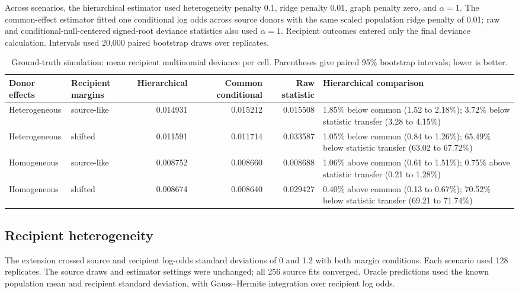 \documentclass[10pt,a4paper]{article}
\begin{document}
Across scenarios, the hierarchical estimator used heterogeneity penalty 0.1, ridge penalty 0.01, graph penalty zero, and $\alpha=1$. The common-effect estimator fitted one conditional log odds across source donors with the same scaled population ridge penalty of 0.01; raw and conditional-null-centered signed-root deviance statistics also used $\alpha=1$. Recipient outcomes entered only the final deviance calculation. Intervals used 20,000 paired bootstrap draws over replicates.

\begin{table}[ht]
\centering
\caption{Ground-truth simulation: mean recipient multinomial deviance per cell. Parentheses give paired 95\% bootstrap intervals; lower is better.}
\label{tab:s-ground-truth}
\small
\begin{tabularx}{\textwidth}{@{}Y Y r r r Y@{}}
\toprule
Donor effects & Recipient margins & Hierarchical & Common conditional & Raw statistic & Hierarchical comparison \\
\midrule
Heterogeneous & source-like & 0.014931 & 0.015212 & 0.015508 & 1.85\% below common (1.52 to 2.18\%); 3.72\% below statistic transfer (3.28 to 4.15\%) \\
Heterogeneous & shifted & 0.011591 & 0.011714 & 0.033587 & 1.05\% below common (0.84 to 1.26\%); 65.49\% below statistic transfer (63.02 to 67.72\%) \\
Homogeneous & source-like & 0.008752 & 0.008660 & 0.008688 & 1.06\% above common (0.61 to 1.51\%); 0.75\% above statistic transfer (0.21 to 1.28\%) \\
Homogeneous & shifted & 0.008674 & 0.008640 & 0.029427 & 0.40\% above common (0.13 to 0.67\%); 70.52\% below statistic transfer (69.21 to 71.74\%) \\
\bottomrule
\end{tabularx}
\end{table}

\subsection{Recipient heterogeneity}

The extension crossed source and recipient log-odds standard deviations of
0 and 1.2 with both margin conditions. Each scenario used 128 replicates.
The source draws and estimator settings were unchanged; all 256 source fits
converged. Oracle predictions used the known population mean and recipient
standard deviation, with Gauss--Hermite integration over recipient log odds.
\end{document}
